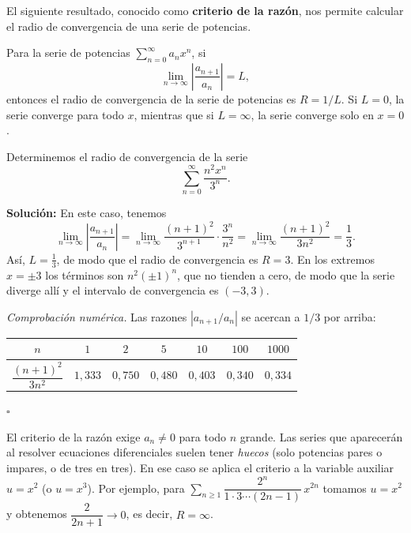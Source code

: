 El siguiente resultado, conocido como \textbf{criterio de la razón}, nos permite calcular el radio de convergencia de una serie de potencias.
 
 \begin{theorem}
     Para la serie de potencias $\sum_{n=0}^{\infty} a_n x^n$, si
\[ \lim_{n \to \infty} \left| \frac{a_{n+1}}{a_n} \right| = L, \]
entonces el radio de convergencia de la serie de potencias es $R = 1/L$. Si $L = 0$, la serie converge para todo $x$, mientras que si $L = \infty$, la serie converge solo en $x = 0$.
 \end{theorem}
 
 \begin{example}
     Determinemos el radio de convergencia de la serie $$\sum_{n=0}^{\infty} \frac{n^2 x^n}{3^n}.$$
 
\noindent \textbf{Solución:} \quad En este caso, tenemos
\[ \lim_{n \to \infty} \left| \frac{a_{n+1}}{a_n} \right| = \lim_{n \to \infty} \frac{(n+1)^2}{3^{n+1}} \cdot \frac{3^n}{n^2} = \lim_{n \to \infty} \frac{(n+1)^2}{3n^2} = \frac{1}{3}. \]
Así, $L = \frac{1}{3}$, de modo que el radio de convergencia es $R = 3$. En los extremos $x=\pm 3$ los términos son $n^2(\pm 1)^n$, que no tienden a cero, de modo que la serie diverge allí y el intervalo de convergencia es $(-3, 3)$.
 
\vspace{.2cm}
\noindent\textit{Comprobación numérica.} Las razones $|a_{n+1}/a_n|$ se acercan a $1/3$ por arriba:
\begin{center}
\small
\begin{tabular}{|c|c|c|c|c|c|c|}
\hline
\rowcolor{bbe!15}$n$ & $1$ & $2$ & $5$ & $10$ & $100$ & $1000$ \\ \hline
$\dfrac{(n+1)^2}{3n^2}$ & $1{,}333$ & $0{,}750$ & $0{,}480$ & $0{,}403$ & $0{,}340$ & $0{,}334$ \\ \hline
\end{tabular}
\end{center}
\hfill $\square$
 \end{example}
 
\begin{note}
El criterio de la razón exige $a_n\neq 0$ para todo $n$ grande. Las series que aparecerán al resolver ecuaciones diferenciales suelen tener \emph{huecos} (solo potencias pares o impares, o de tres en tres). En ese caso se aplica el criterio a la variable auxiliar $u=x^2$ (o $u=x^3$). Por ejemplo, para $\sum_{n\ge 1} \dfrac{2^n}{1\cdot 3\cdots(2n-1)}\,x^{2n}$ tomamos $u=x^2$ y obtenemos $\dfrac{2}{2n+1}\to 0$, es decir, $R=\infty$.
\end{note}
 

